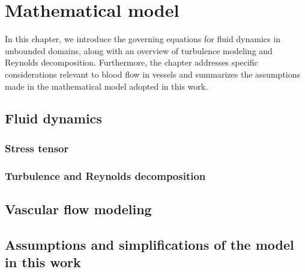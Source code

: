 \chapter{Mathematical model}
In this chapter, we introduce the governing equations for fluid  dynamics in unbounded domains, along with an overview of turbulence modeling and Reynolds decomposition. Furthermore, the chapter addresses specific considerations relevant to blood flow in vessels and summarizes the assumptions made in the mathematical model adopted in this work.

\section{Fluid dynamics}


\subsection{Stress tensor}


\subsection{Turbulence and Reynolds decomposition}\label{turb}


\section{Vascular flow modeling}\label{cevni proudeni}


\section{Assumptions and simplifications of the model in this work}\label{pred}
